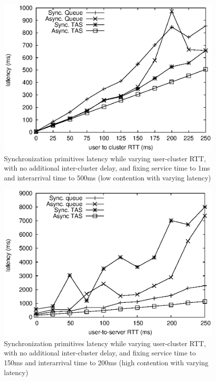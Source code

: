 \begin{figure}[h]
\centering
\includegraphics[scale=0.68]{img/primitives_fixClusterLatency-0.eps}
\caption{Synchronization primitives latency while varying user-cluster RTT, with no additional inter-cluster delay, and fixing service time to 1ms and interarrival time to 500ms (low contention with varying latency)}
\label{fig:primitives_vary_delay_lowcontention}
\end{figure}

\begin{figure}[h]
\centering
\includegraphics[scale=0.68]{img/fixService-150_varyLatency.eps}
\caption{Synchronization primitives latency while varying user-cluster RTT, with no additional inter-cluster delay, and fixing service time to 150ms and interarrival time to 200ms (high contention with varying latency)}
\label{fig:primitives_vary_delay_highcontention}
\end{figure}

